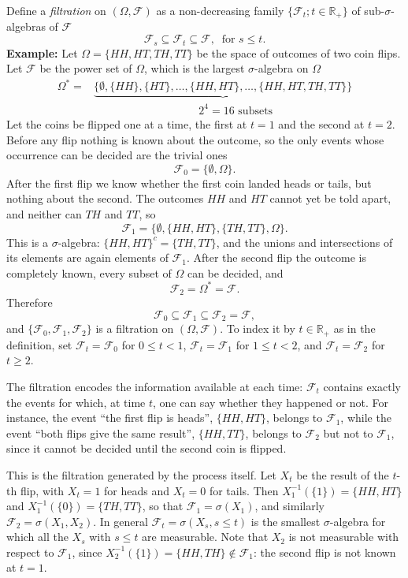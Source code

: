 \documentclass[11pt]{article}
\begin{document}
Define a {\it filtration} on $(\Omega,\mathcal{F})$ as a non-decreasing family $\{\mathcal{F}_t;t\in\mathbb{R}_+\}$ of sub-$\sigma$-algebras of $\mathcal{F}$
$$\mathcal{F}_s\subseteq\mathcal{F}_t\subseteq\mathcal{F},\ \text{ for }s\leq t.$$
{\bf Example:} Let $\Omega=\{HH,HT,TH,TT\}$ be the space of outcomes of two coin flips. Let $\mathcal{F}$ be the power set of $\Omega$, which is the largest $\sigma$-algebra on $\Omega$
\begin{align}
  \Omega^*=&\underbrace{\{\emptyset,\{HH\},\{HT\},\dots,\{HH,HT\},\dots,\{HH,HT,TH,TT\}\}}\nonumber\\
  &\hspace{4cm}2^4=16\text{ subsets}\nonumber
\end{align}
Let the coins be flipped one at a time, the first at $t=1$ and the second at $t=2$. Before any flip nothing is known about the outcome, so the only events whose occurrence can be decided are the trivial ones
$$\mathcal{F}_0=\{\emptyset,\Omega\}.$$
After the first flip we know whether the first coin landed heads or tails, but nothing about the second. The outcomes $HH$ and $HT$ cannot yet be told apart, and neither can $TH$ and $TT$, so
$$\mathcal{F}_1=\{\emptyset,\{HH,HT\},\{TH,TT\},\Omega\}.$$
This is a $\sigma$-algebra: $\{HH,HT\}^c=\{TH,TT\}$, and the unions and intersections of its elements are again elements of $\mathcal{F}_1$. After the second flip the outcome is completely known, every subset of $\Omega$ can be decided, and
$$\mathcal{F}_2=\Omega^*=\mathcal{F}.$$
Therefore
$$\mathcal{F}_0\subseteq\mathcal{F}_1\subseteq\mathcal{F}_2=\mathcal{F},$$
and $\{\mathcal{F}_0,\mathcal{F}_1,\mathcal{F}_2\}$ is a filtration on $(\Omega,\mathcal{F})$. To index it by $t\in\mathbb{R}_+$ as in the definition, set $\mathcal{F}_t=\mathcal{F}_0$ for $0\leq t<1$, $\mathcal{F}_t=\mathcal{F}_1$ for $1\leq t<2$, and $\mathcal{F}_t=\mathcal{F}_2$ for $t\geq 2$.

The filtration encodes the information available at each time: $\mathcal{F}_t$ contains exactly the events for which, at time $t$, one can say whether they happened or not. For instance, the event ``the first flip is heads'', $\{HH,HT\}$, belongs to $\mathcal{F}_1$, while the event ``both flips give the same result'', $\{HH,TT\}$, belongs to $\mathcal{F}_2$ but not to $\mathcal{F}_1$, since it cannot be decided until the second coin is flipped.

This is the filtration generated by the process itself. Let $X_t$ be the result of the $t$-th flip, with $X_t=1$ for heads and $X_t=0$ for tails. Then $X_1^{-1}(\{1\})=\{HH,HT\}$ and $X_1^{-1}(\{0\})=\{TH,TT\}$, so that $\mathcal{F}_1=\sigma(X_1)$, and similarly $\mathcal{F}_2=\sigma(X_1,X_2)$. In general $\mathcal{F}_t=\sigma(X_s,s\leq t)$ is the smallest $\sigma$-algebra for which all the $X_s$ with $s\leq t$ are measurable. Note that $X_2$ is not measurable with respect to $\mathcal{F}_1$, since $X_2^{-1}(\{1\})=\{HH,TH\}\notin\mathcal{F}_1$: the second flip is not known at $t=1$.
\end{document}
